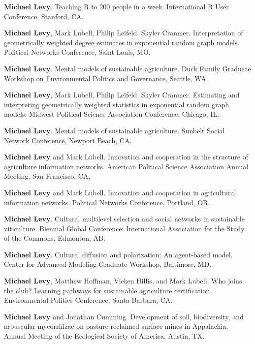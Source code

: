\begin{description}
\tightlist
\item[2016]
\textbf{Michael Levy}. Teaching R to 200 people in a week. International
R User Conference, Stanford, CA.
\item[2016]
\textbf{Michael Levy}, Mark Lubell, Philip Leifeld, Skyler Cranmer.
Interpretation of geometrically weighted degree estimates in exponential
random graph models. Political Networks Conference, Saint Louis, MO.
\item[2016]
\textbf{Michael Levy}. Mental models of sustainable agriculture. Duck
Family Graduate Workshop on Environmental Politics and Governance,
Seattle, WA.
\item[2016]
\textbf{Michael Levy}, Mark Lubell, Philip Leifeld, Skyler Cranmer.
Estimating and interpreting geometrically weighted statistics in
exponential random graph models. Midwest Political Science Association
Conference, Chicago, IL.
\item[2016]
\textbf{Michael Levy}. Mental models of sustainable agriculture. Sunbelt
Social Network Conference, Newport Beach, CA.
\item[2015]
\textbf{Michael Levy} and Mark Lubell. Innovation and cooperation in the
structure of agriculture information networks. American Political
Science Association Annual Meeting, San Francisco, CA.
\item[2015]
\textbf{Michael Levy} and Mark Lubell. Innovation and cooperation in
agricultural information networks. Political Networks Conference,
Portland, OR.
\item[2015]
\textbf{Michael Levy}. Cultural multilevel selection and social networks
in sustainable viticulture. Biennial Global Conference: International
Association for the Study of the Commons, Edmonton, AB.
\item[2014]
\textbf{Michael Levy}. Cultural diffusion and polarization: An
agent-based model. Center for Advanced Modeling Graduate Workshop,
Baltimore, MD.
\item[2014]
\textbf{Michael Levy}, Matthew Hoffman, Vicken Hillis, and Mark Lubell.
Who joins the club? Learning pathways for sustainable agriculture
certification. Environmental Politics Conference, Santa Barbara, CA.
\item[2011]
\textbf{Michael Levy} and Jonathan Cumming. Development of soil,
biodiversity, and arbuscular mycorrhizae on pasture-reclaimed surface
mines in Appalachia. Annual Meeting of the Ecological Society of
America, Austin, TX.
\end{description}


